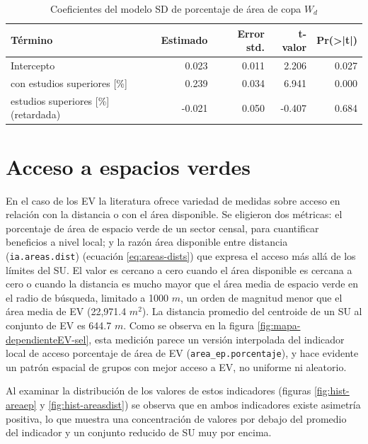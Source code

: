 \documentclass[12pt,a4paper,oneside, openany]{book}
\theoremstyle{definition}
\theoremstyle{definition}
\theoremstyle{definition}
\theoremstyle{remark}
\begin{document}
\begin{table}[H]

\caption{\label{tab:coef-sd-copaap}Coeficientes del modelo SD de porcentaje de área de copa $W_d$}
\centering
\begin{tabular}{lrrrr}
\toprule
Término & Estimado & Error std. & t-valor & Pr(>|t|)\\
\midrule
Intercepto & 0.023 & 0.011 & 2.206 & 0.027\\
con estudios superiores [\%] & 0.239 & 0.034 & 6.941 & 0.000\\
estudios superiores [\%] (retardada) & -0.021 & 0.050 & -0.407 & 0.684\\
\bottomrule
\end{tabular}
\end{table}

\section{Acceso a espacios verdes}\label{acceso-a-espacios-verdes-1}

En el caso de los EV la literatura ofrece variedad de medidas sobre
acceso en relación con la distancia o con el área disponible. Se
eligieron dos métricas: el porcentaje de área de espacio verde de un
sector censal, para cuantificar beneficios a nivel local; y la razón
área disponible entre distancia (\texttt{ia.areas.dist}) (ecuación
\eqref{eq:areas-dists}) que expresa el acceso más allá de los límites del
SU. El valor es cercano a cero cuando el área disponible es cercana a
cero o cuando la distancia es mucho mayor que el área media de espacio
verde en el radio de búsqueda, limitado a 1000 \(m\), un orden de
magnitud menor que el área media de EV (22,971.4 \(m^2\)). La distancia
promedio del centroide de un SU al conjunto de EV es 644.7 \(m\). Como
se observa en la figura \ref{fig:mapa-dependienteEV-sel}, esta medición
parece un versión interpolada del indicador local de acceso porcentaje
de área de EV (\texttt{area\_ep.porcentaje}), y hace evidente un patrón
espacial de grupos con mejor acceso a EV, no uniforme ni aleatorio.

Al examinar la distribución de los valores de estos indicadores (figuras
\ref{fig:hist-areaep} y \ref{fig:hist-areasdist}) se observa que en
ambos indicadores existe asimetría positiva, lo que muestra una
concentración de valores por debajo del promedio del indicador y un
conjunto reducido de SU muy por encima.
\end{document}
